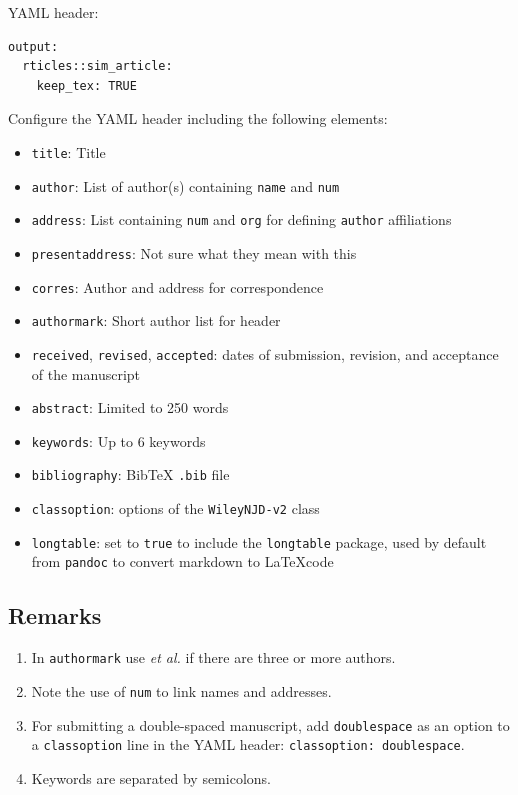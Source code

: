 \documentclass[AMA,STIX1COL,]{WileyNJD-v2}
\begin{document}
YAML header:

\begin{verbatim}
output:
  rticles::sim_article:
    keep_tex: TRUE
\end{verbatim}

Configure the YAML header including the following elements:

\begin{itemize}
\item
  \texttt{title}: Title
\item
  \texttt{author}: List of author(s) containing \texttt{name} and
  \texttt{num}
\item
  \texttt{address}: List containing \texttt{num} and \texttt{org} for
  defining \texttt{author} affiliations
\item
  \texttt{presentaddress}: Not sure what they mean with this
\item
  \texttt{corres}: Author and address for correspondence
\item
  \texttt{authormark}: Short author list for header
\item
  \texttt{received}, \texttt{revised}, \texttt{accepted}: dates of
  submission, revision, and acceptance of the manuscript
\item
  \texttt{abstract}: Limited to 250 words
\item
  \texttt{keywords}: Up to 6 keywords
\item
  \texttt{bibliography}: BibTeX \texttt{.bib} file
\item
  \texttt{classoption}: options of the \texttt{WileyNJD-v2} class
\item
  \texttt{longtable}: set to \texttt{true} to include the
  \texttt{longtable} package, used by default from \texttt{pandoc} to
  convert markdown to \LaTeX code
\end{itemize}

\hypertarget{remarks}{%
\subsection{Remarks}\label{remarks}}

\begin{enumerate}
\def\labelenumi{\arabic{enumi}.}
\item
  In \texttt{authormark} use \emph{et al.} if there are three or more
  authors.
\item
  Note the use of \texttt{num} to link names and addresses.
\item
  For submitting a double-spaced manuscript, add \texttt{doublespace} as
  an option to a \texttt{classoption} line in the YAML header:
  \texttt{classoption:\ doublespace}.
\item
  Keywords are separated by semicolons.
\end{enumerate}
\end{document}

